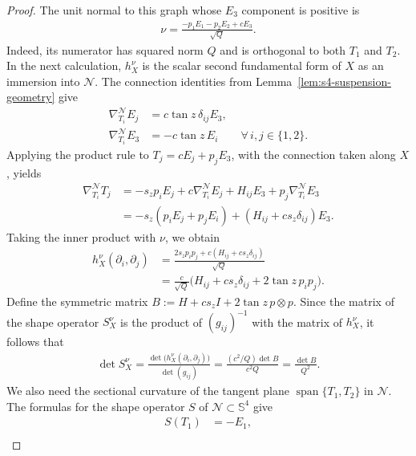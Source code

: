\documentclass[a4paper,11pt,oneside,reqno]{amsart}
\numberwithin{equation}{section}
\theoremstyle{definition}
\begin{document}
\begin{proof}
    The unit normal to this graph whose $E_3$ component
    is positive is
    \begin{align*}
        \nu=\frac{-p_1E_1-p_2E_2+cE_3}{\sqrt Q}.
    \end{align*}
    Indeed, its numerator has squared norm $Q$ and is
    orthogonal to both $T_1$ and $T_2$. In the next
    calculation, $h_X^\nu$ is the scalar second fundamental
    form of $X$ as an immersion into $\mathcal N$.
    The connection identities from
    Lemma~\ref{lem:s4-suspension-geometry} give
    \begin{align*}
        \nabla^{\mathcal N}_{T_i}E_j
        &=c\tan z\,\delta_{ij}E_3,\\
        \nabla^{\mathcal N}_{T_i}E_3
        &=-c\tan z\,E_i
        \qquad\forall\,i,j\in\{1,2\}.
    \end{align*}
    Applying the product rule to $T_j=cE_j+p_jE_3$,
    with the connection taken along $X$, yields
    \begin{align*}
        \nabla^{\mathcal N}_{T_i}T_j
        &=-s_z p_iE_j+c\nabla^{\mathcal N}_{T_i}E_j
          +H_{ij}E_3+p_j\nabla^{\mathcal N}_{T_i}E_3\\
        &=-s_z(p_iE_j+p_jE_i)
          +(H_{ij}+c s_z\delta_{ij})E_3.
    \end{align*}
    Taking the inner product with $\nu$, we obtain
    \begin{align*}
        h_X^\nu(\partial_i,\partial_j)
        &=\frac{2s_z p_ip_j+c(H_{ij}+c s_z\delta_{ij})}{\sqrt Q}\\
        &=\frac{c}{\sqrt Q}
        \bigl(H_{ij}+c s_z\delta_{ij}+2\tan z\,p_ip_j\bigr).
    \end{align*}
    Define the symmetric matrix
    $B:=H+c s_z I+2\tan z\,p\otimes p$.
    Since the matrix of the shape operator $S_X^\nu$
    is the product of $(g_{ij})^{-1}$ with the matrix
    of $h_X^\nu$, it follows that
    \begin{align*}
        \det S_X^\nu
        =\frac{\det\bigl(h_X^\nu(\partial_i,\partial_j)\bigr)}
        {\det(g_{ij})}
        =\frac{(c^2/Q)\det B}{c^2Q}
        =\frac{\det B}{Q^2}.
    \end{align*}
    We also need the sectional curvature of the tangent
    plane $\operatorname{span}\{T_1,T_2\}$ in $\mathcal N$.
    The formulas for the shape operator $S$ of
    $\mathcal N\subset\mathbb S^4$ give
    \begin{align*}
        S(T_1)&=-E_1,\\

\end{align*}
\end{proof}
\end{document}
